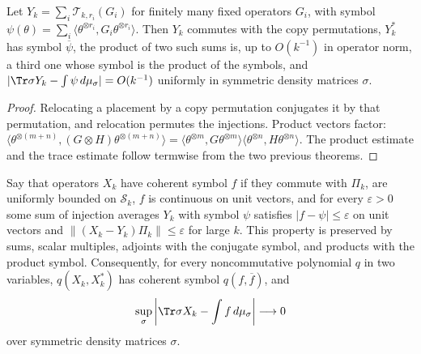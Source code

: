 \begin{lemma}
    \label{lem:injection_poly}
    \leanok
    Let $Y_k=\sum_i\mathcal T_{k,r_i}(G_i)$ for finitely many fixed operators $G_i$, with
    symbol $\psi(\theta)=\sum_i\langle\theta^{\otimes r_i},G_i\theta^{\otimes r_i}\rangle$.
    Then $Y_k$ commutes with the copy permutations, $Y_k^\ast$ has symbol
    $\overline\psi$, the product of two such sums is, up to $O(k^{-1})$ in operator norm, a
    third one whose symbol is the product of the symbols, and
    $|\Tr\sigma Y_k-\int\psi\,d\mu_\sigma|=O(k^{-1})$ uniformly in symmetric density matrices
    $\sigma$.
\end{lemma}

\begin{proof}\leanok
    Relocating a placement by a copy permutation conjugates it by that permutation, and
    relocation permutes the injections. Product vectors factor:
    $\langle\theta^{\otimes(m+n)},(G\otimes H)\theta^{\otimes(m+n)}\rangle
    =\langle\theta^{\otimes m},G\theta^{\otimes m}\rangle
    \langle\theta^{\otimes n},H\theta^{\otimes n}\rangle$. The product estimate and the trace
    estimate follow termwise from the two previous theorems.
\end{proof}

\begin{theorem}
    \label{thm:coherent_symbol}
    \leanok
    Say that operators $X_k$ have coherent symbol $f$ if they commute with $\Pi_k$, are
    uniformly bounded on $\mathcal S_k$, $f$ is continuous on unit vectors, and for every
    $\varepsilon>0$ some sum of injection averages $Y_k$ with symbol $\psi$ satisfies
    $|f-\psi|\le\varepsilon$ on unit vectors and $\|(X_k-Y_k)\Pi_k\|\le\varepsilon$ for large
    $k$. This property is preserved by sums, scalar multiples, adjoints with the conjugate
    symbol, and products with the product symbol. Consequently, for every noncommutative
    polynomial $q$ in two variables, $q(X_k,X_k^\ast)$ has coherent symbol
    $q(f,\overline f)$, and
    \[
        \sup_\sigma\left|\Tr\sigma X_k-\int f\,d\mu_\sigma\right|\longrightarrow0
    \]
    over symmetric density matrices $\sigma$.
\end{theorem}

